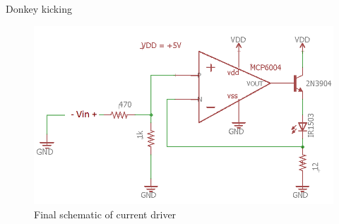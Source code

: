 
	
	Donkey kicking
\begin{figure}[H]
	\centering
	\includegraphics[width=0.7\linewidth]{ExperimentalImplementation/LEDDriverExperimentalSchem}
	\caption{Final schematic of current driver}
	\label{fig:leddriverexperimentalschem}
\end{figure}

